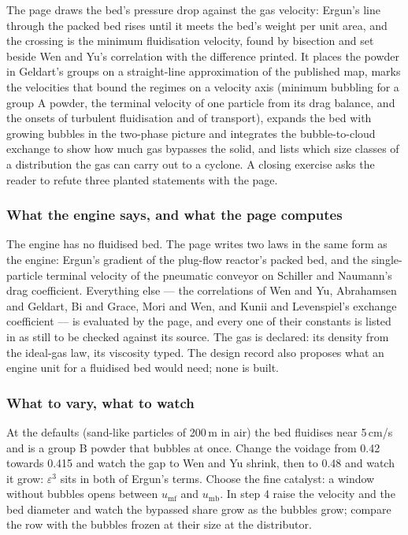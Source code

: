 \documentclass[11pt,a4paper]{article}
\begin{document}
The page draws the bed's pressure drop against the gas velocity: Ergun's line
through the packed bed rises until it meets the bed's weight per unit area, and
the crossing is the minimum fluidisation velocity, found by bisection and set
beside Wen and Yu's correlation with the difference printed.  It places the
powder in Geldart's groups on a straight-line approximation of the published
map, marks the velocities that bound the regimes on a velocity axis (minimum
bubbling for a group A powder, the terminal velocity of one particle from its
drag balance, and the onsets of turbulent fluidisation and of transport),
expands the bed with growing bubbles in the two-phase picture and integrates
the bubble-to-cloud exchange to show how much gas bypasses the solid, and lists
which size classes of a distribution the gas can carry out to a cyclone.  A
closing exercise asks the reader to refute three planted statements with the
page.

\subsubsection*{What the engine says, and what the page computes}

The engine has no fluidised bed.  The page writes two laws in the same form as
the engine: Ergun's gradient of the plug-flow reactor's packed bed, and the
single-particle terminal velocity of the pneumatic conveyor on Schiller and
Naumann's drag coefficient.  Everything else --- the correlations of Wen and Yu,
Abrahamsen and Geldart, Bi and Grace, Mori and Wen, and Kunii and Levenspiel's
exchange coefficient --- is evaluated by the page, and every one of their
constants is listed in  as
still to be checked against its source.  The gas is declared: its density from
the ideal-gas law, its viscosity typed.  The design record also proposes what
an engine unit for a fluidised bed would need; none is built.

\subsubsection*{What to vary, what to watch}

\begin{tryit}
At the defaults (sand-like particles of 200\,\textmu m in air) the bed fluidises
near 5\,cm/s and is a group B powder that bubbles at once.  Change the voidage
from 0.42 towards 0.415 and watch the gap to Wen and Yu shrink, then to 0.48
and watch it grow: $\varepsilon^3$ sits in both of Ergun's terms.  Choose the
fine catalyst: a window without bubbles opens between $u_{\mathrm{mf}}$ and
$u_{\mathrm{mb}}$.  In step 4 raise the velocity and the bed diameter and watch
the bypassed share grow as the bubbles grow; compare the row with the bubbles
frozen at their size at the distributor.
\end{tryit}
\end{document}
